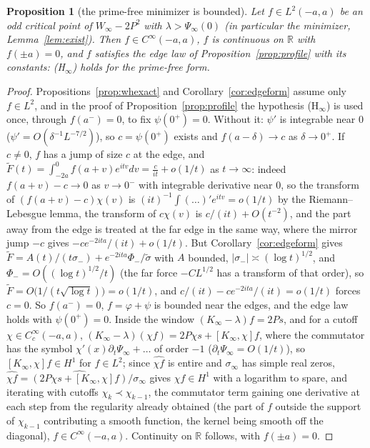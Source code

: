 \documentclass[11pt]{article}
\newtheorem{proposition}[theorem]{Proposition}
\theoremstyle{definition}
\theoremstyle{remark}
\newcommand{\R}{\mathbb{R}}
\begin{document}
\begin{proposition}[the prime-free minimizer is bounded]\label{prop:bounded}
Let $f\in L^2(-a,a)$ be an odd critical point of $W_\infty-2P^2$ with $\lambda>\Psi_\infty(0)$ (in particular the minimizer, Lemma~\ref{lem:exist}). Then $f\in C^\infty(-a,a)$, $f$ is continuous on $\R$ with $f(\pm a)=0$, and $f$ satisfies the edge law of Proposition~\ref{prop:profile} with its constants: (H$_\infty$) holds for the prime-free form.
\end{proposition}
\begin{proof}
Propositions~\ref{prop:whexact} and Corollary~\ref{cor:edgeform} assume only $f\in L^2$, and in the proof of Proposition~\ref{prop:profile} the hypothesis (H$_\infty$) is used once, through $f(a^-)=0$, to fix $\psi(0^+)=0$. Without it: $\psi'$ is integrable near $0$ ($\psi'=O(\delta^{-1}L^{-7/2})$), so $c=\psi(0^+)$ exists and $f(a-\delta)\to c$ as $\delta\to0^+$. If $c\ne0$, $f$ has a jump of size $c$ at the edge, and $\tilde F(t)=\int_{-2a}^0f(a+v)e^{itv}dv=\frac{c}{it}+o(1/t)$ as $t\to\infty$: indeed $f(a+v)-c\to0$ as $v\to0^-$ with integrable derivative near $0$, so the transform of $(f(a+v)-c)\chi(v)$ is $(it)^{-1}\int(\dots)'e^{itv}=o(1/t)$ by the Riemann--Lebesgue lemma, the transform of $c\chi(v)$ is $c/(it)+O(t^{-2})$, and the part away from the edge is treated at the far edge in the same way, where the mirror jump $-c$ gives $-ce^{-2ita}/(it)+o(1/t)$. But Corollary~\ref{cor:edgeform} gives $\tilde F=A(t)/(t\sigma_-)+e^{-2ita}\Phi_-/\tilde\sigma$ with $A$ bounded, $|\sigma_-|\asymp(\log t)^{1/2}$, and $\Phi_-=O((\log t)^{1/2}/t)$ (the far force $-CL^{1/2}$ has a transform of that order), so $\tilde F=O\big(1/(t\sqrt{\log t})\big)=o(1/t)$, and $c/(it)-ce^{-2ita}/(it)=o(1/t)$ forces $c=0$. So $f(a^-)=0$, $f=\varphi+\psi$ is bounded near the edges, and the edge law holds with $\psi(0^+)=0$. Inside the window $(K_\infty-\lambda)f=2Ps$, and for a cutoff $\chi\in C_c^\infty(-a,a)$, $(K_\infty-\lambda)(\chi f)=2P\chi s+[K_\infty,\chi]f$, where the commutator has the symbol $\chi'(x)\partial_t\Psi_\infty+\dots$ of order $-1$ ($\partial_t\Psi_\infty=O(1/t)$), so $[K_\infty,\chi]f\in H^1$ for $f\in L^2$; since $\widehat{\chi f}$ is entire and $\sigma_\infty$ has simple real zeros, $\widehat{\chi f}=\widehat{(2P\chi s+[K_\infty,\chi]f)}/\sigma_\infty$ gives $\chi f\in H^1$ with a logarithm to spare, and iterating with cutoffs $\chi_k\prec\chi_{k-1}$, the commutator term gaining one derivative at each step from the regularity already obtained (the part of $f$ outside the support of $\chi_{k-1}$ contributing a smooth function, the kernel being smooth off the diagonal), $f\in C^\infty(-a,a)$. Continuity on $\R$ follows, with $f(\pm a)=0$.
\end{proof}
\end{document}
